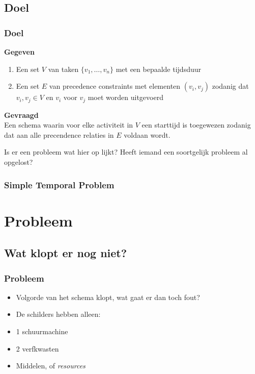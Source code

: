 \documentclass{beamer}
\theoremstyle{definition}
\begin{document}
\subsection{Doel}
\begin{frame}
    	\frametitle{Doel}
   	\textbf{Gegeven}
	\begin{enumerate}
		\item Een set $V$ van taken $\{v_1,\dots,v_n\}$ met een bepaalde tijdsduur
		\item Een set $E$ van precedence constraints met elementen $(v_i, v_j)$ zodanig dat $v_i, v_j \in V$ en $v_i$ voor $v_j$ moet worden uitgevoerd
	\end{enumerate}
	
	\textbf{Gevraagd}\\
	Een schema waarin voor elke activiteit in $V$ een starttijd is toegewezen zodanig dat aan alle precendence relaties in $E$ voldaan wordt.
\end{frame}

\begin{frame}
	\begin{center}
		Is er een probleem wat hier op lijkt? Heeft iemand een soortgelijk probleem al opgelost?
	\end{center}
\end{frame}

\begin{frame}
    	\frametitle{Simple Temporal Problem}
   	
\end{frame}

\section{Probleem}
\subsection{Wat klopt er nog niet?}
\begin{frame}
\frametitle{Probleem}
	\begin{itemize}
		\item Volgorde van het schema klopt, wat gaat er dan toch fout?
		\item<2->  De schilders hebben alleen:
		\item<2-> 1 schuurmachine
		\item<2-> 2 verfkwasten
		\item<3-> Middelen, of \emph{resources}
	\end{itemize}
\end{frame}
\end{document}
